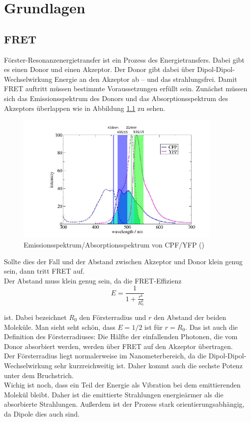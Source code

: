 
\chapter{Grundlagen}

\section{FRET}

Förster-Resonanzenergietransfer ist ein Prozess des Energietransfers. Dabei gibt es einen Donor und einen Akzeptor. Der Donor gibt dabei über Dipol-Dipol-Wechselwirkung 
Energie an den Akzeptor ab – und das strahlungsfrei.
Damit FRET auftritt müssen bestimmte Voraussetzungen erfüllt sein. Zunächst müssen sich das Emissionsspektrum des Donors und das Absorptionsspektrum des Akzeptors überlappen wie in  
Abbildung \ref{bild:FRETSpektrum} zu sehen.

\begin{figure}[h]
    \centering
    \includegraphics[width = 10cm]{Bilder/Grundlagen/FRETSpektrum.png}
    \caption{Emissionsspektrum/Absorptionsspektrum von CPF/YFP (\cite{FRETSkript})}
    \label{bild:FRETSpektrum}
\end{figure}

Sollte dies der Fall und der Abstand zwischen Akzeptor und Donor klein genug sein, dann tritt FRET auf. \\
Der Abstand muss klein genug sein, da die FRET-Effizienz\\


\begin{equation}
    E = \frac{1}{1+\frac{r^6}{R_0^6}}
\end{equation}

ist. Dabei bezeichnet $R_0$ den Försterradius und $r$ den Abstand der beiden Moleküle. Man sieht seht schön, dass $E = 1/2$ ist für $r = R_0$. Das ist auch die 
Definition des Försterradiuses: Die Hälfte der einfallenden Photonen, die vom Donor absorbiert werden, werden über FRET auf den Akzeptor übertragen.\\
Der Försterradius liegt normalerweise im Nanometerbereich, da die Dipol-Dipol-Wechselwirkung sehr kurzreichweitig ist. Daher kommt auch die sechste Potenz unter dem Bruchstrich.\\
Wichig ist noch, dass ein Teil der Energie als Vibration bei dem emittierenden Molekül bleibt. Daher ist die emittierte Strahlungen energieärmer als die absorbierte Strahlungen. Außerdem 
ist der Prozess stark orientierungsabhängig, da Dipole dies auch sind.



